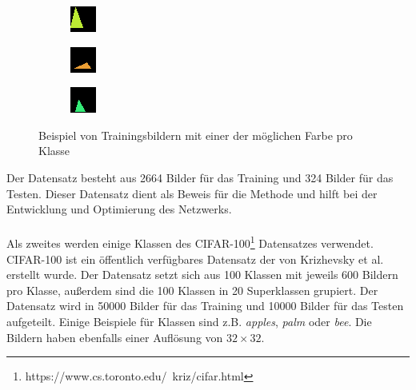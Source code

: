 \begin{figure}[H]
  \begin{subfigure}
    \centering
    \includegraphics[width=.15\textwidth]{resources/dataset/dummy/triangle41.png}
  \end{subfigure}
  \begin{subfigure}
    \centering
    \includegraphics[width=.15\textwidth]{resources/dataset/dummy/triangle49.png}
  \end{subfigure}
  \begin{subfigure}
    \centering
    \includegraphics[width=.15\textwidth]{resources/dataset/dummy/triangle51.png}
  \end{subfigure}
  \caption{Beispiel von Trainingsbildern mit einer der möglichen Farbe pro Klasse}
  \label{image:dummy}
\end{figure}

Der Datensatz besteht aus 2664 Bilder für das Training und 324 Bilder für das Testen.
Dieser Datensatz dient als Beweis für die Methode und hilft bei der Entwicklung und Optimierung des Netzwerks.
\\
\\
Als zweites werden einige Klassen des CIFAR-100\footnote{https://www.cs.toronto.edu/~kriz/cifar.html} Datensatzes verwendet. CIFAR-100 ist 
ein öffentlich verfügbares Datensatz der von Krizhevsky et al. erstellt wurde. Der Datensatz setzt sich aus 100 Klassen mit jeweils 600 
Bildern pro Klasse, außerdem sind die 100 Klassen in 20 Superklassen grupiert. Der Datensatz wird in 50000 Bilder für das Training und 
10000 Bilder für das Testen aufgeteilt. Einige Beispiele für Klassen sind z.B. \textit{apples}, \textit{palm} oder \textit{bee}. 
Die Bildern haben ebenfalls einer Auflösung von $ 32 \times 32 $.

